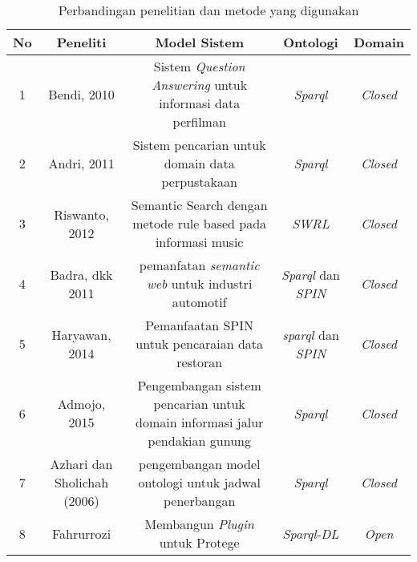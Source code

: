 \begin{landscape}
\begin{table}[h]
	\caption{Perbandingan penelitian dan metode yang digunakan}
	\label{table:perbandingan_penelitian}
	\begin{center}
	\begin{tabular}{|c|c|c|c|c|}
		\hline
		No & Peneliti & Model Sistem & Ontologi & Domain \\
		\hline
		1 & Bendi, 2010 & Sistem \emph{Question Answering} untuk informasi data perfilman & \emph{Sparql} & \emph{Closed} \\
		\hline
		2 & Andri, 2011 & Sistem pencarian untuk domain data perpustakaan & \emph{Sparql} & \emph{Closed} \\
		\hline
		3 & Riswanto, 2012 & Semantic Search dengan metode rule based pada informasi music & \emph{SWRL} & \emph{Closed} \\
		\hline
		4 & Badra, dkk 2011 & pemanfatan \emph{semantic web} untuk industri automotif & \emph{Sparql} dan \emph{SPIN} & \emph{Closed} \\
		\hline
		5 & Haryawan, 2014 & Pemanfaatan SPIN untuk pencaraian data restoran & \emph{sparql} dan \emph{SPIN} & \emph{Closed} \\
		\hline
		6 & Admojo, 2015 & Pengembangan sistem pencarian untuk domain informasi jalur pendakian gunung  & \emph{Sparql}  & \emph{Closed} \\
		\hline
		7 & Azhari dan Sholichah (2006) & pengembangan model ontologi untuk jadwal penerbangan & \emph{Sparql} & \emph{Closed} \\
		\hline
		8 & Fahrurrozi & Membangun \emph{Plugin} untuk Protege & \emph{Sparql-DL} & \emph{Open} \\
		\hline
	\end{tabular}
	\end{center}
\end{table}
\end{landscape}